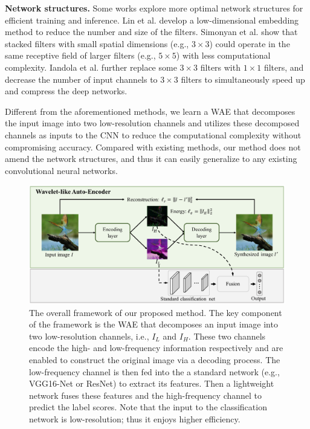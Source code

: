 \documentclass[letterpaper]{article} %
\begin{document}
\noindent\textbf{Network structures. }Some works explore more optimal network structures for efficient training and inference.  Lin et al. \cite{lin2013network} develop a low-dimensional embedding method to reduce the number and size of the filters. Simonyan et al. \cite{simonyan2014very} show that stacked filters with small spatial dimensions (e.g., $3 \times 3$) could operate in the same receptive field of larger filters (e.g., $5 \times 5$) with less computational complexity. Iandola et al. \cite{iandola2016squeezenet} further replace some $3 \times 3$ filters with $1 \times 1$ filters, and decrease the number of input channels to $3 \times 3$ filters to simultaneously speed up and compress the deep networks. 

Different from the aforementioned methods, we learn a WAE that decomposes the input image into two low-resolution channels and utilizes these decomposed channels as inputs to the CNN to reduce the computational complexity without compromising accuracy. Compared with existing methods, our method does not amend the network structures, and thus it can easily generalize to any existing convolutional neural networks.



\begin{figure}[htbp]
   \centering
   \includegraphics[width=0.75\linewidth]{framework_v2.pdf}
   \vspace{-6pt}
   \caption{The overall framework of our proposed method. The key component of the framework is the WAE that decomposes an input image into two low-resolution channels, i.e., $I_L$ and $I_H$. These two channels encode the high- and low-frequency information respectively and are enabled to construct the original image via a decoding process. The low-frequency channel is then fed into the a standard network (e.g., VGG16-Net or ResNet) to extract its features. Then a lightweight network fuses these features and the high-frequency channel to predict the label scores. Note that the input to the classification network is low-resolution; thus it enjoys higher efficiency.}
   \label{fig:cls_net}
\end{figure}
\end{document}
